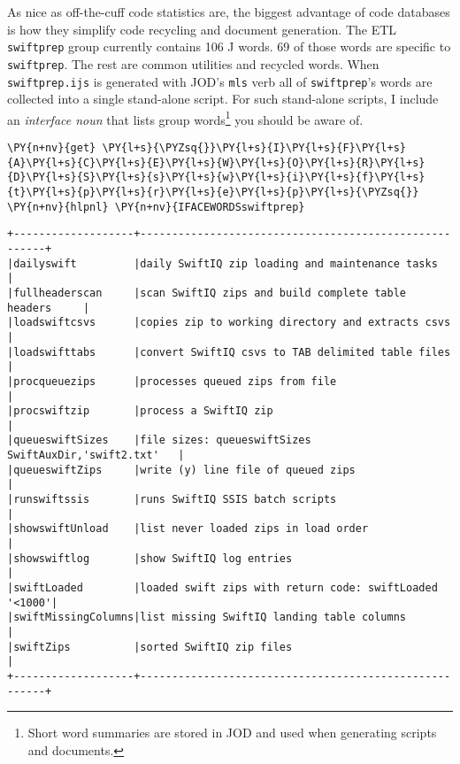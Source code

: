     As nice as off-the-cuff code statistics are, the biggest advantage of
code databases is how they simplify code recycling and document
generation. The ETL \texttt{swiftprep} group currently contains 106 J
words. 69 of those words are specific to \texttt{swiftprep}. The rest
are common utilities and recycled words. When \texttt{swiftprep.ijs} is
generated with JOD's \texttt{mls} verb all of \texttt{swiftprep}'s words
are collected into a single stand-alone script. For such stand-alone
scripts, I include an \emph{interface noun} that lists group
words\footnote{Short word summaries are stored in JOD and used when generating scripts and documents.}
you should be aware of.

    \begin{tcolorbox}[breakable, size=fbox, boxrule=1pt, pad at break*=1mm,colback=cellbackground, colframe=cellborder]
\begin{Verbatim}[commandchars=\\\{\}]
\PY{n+nv}{get} \PY{l+s}{\PYZsq{}}\PY{l+s}{I}\PY{l+s}{F}\PY{l+s}{A}\PY{l+s}{C}\PY{l+s}{E}\PY{l+s}{W}\PY{l+s}{O}\PY{l+s}{R}\PY{l+s}{D}\PY{l+s}{S}\PY{l+s}{s}\PY{l+s}{w}\PY{l+s}{i}\PY{l+s}{f}\PY{l+s}{t}\PY{l+s}{p}\PY{l+s}{r}\PY{l+s}{e}\PY{l+s}{p}\PY{l+s}{\PYZsq{}}
\PY{n+nv}{hlpnl} \PY{n+nv}{IFACEWORDSswiftprep}
\end{Verbatim}
\end{tcolorbox}

    \begin{Verbatim}[commandchars=\\\{\}]
+-------------------+-------------------------------------------------------+
|dailyswift         |daily SwiftIQ zip loading and maintenance tasks        |
|fullheaderscan     |scan SwiftIQ zips and build complete table headers     |
|loadswiftcsvs      |copies zip to working directory and extracts csvs      |
|loadswifttabs      |convert SwiftIQ csvs to TAB delimited table files      |
|procqueuezips      |processes queued zips from file                        |
|procswiftzip       |process a SwiftIQ zip                                  |
|queueswiftSizes    |file sizes: queueswiftSizes SwiftAuxDir,'swift2.txt'   |
|queueswiftZips     |write (y) line file of queued zips                     |
|runswiftssis       |runs SwiftIQ SSIS batch scripts                        |
|showswiftUnload    |list never loaded zips in load order                   |
|showswiftlog       |show SwiftIQ log entries                               |
|swiftLoaded        |loaded swift zips with return code: swiftLoaded '<1000'|
|swiftMissingColumns|list missing SwiftIQ landing table columns             |
|swiftZips          |sorted SwiftIQ zip files                               |
+-------------------+-------------------------------------------------------+
    \end{Verbatim}

